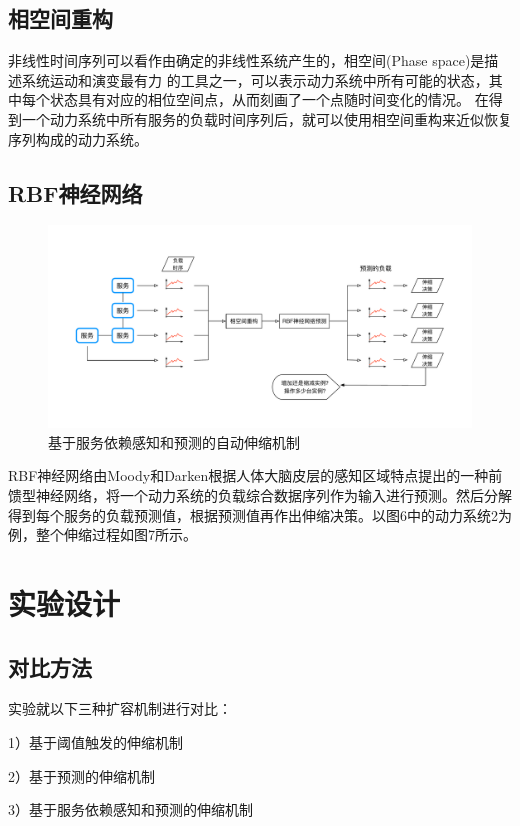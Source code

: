 \documentclass[10.5pt,twocolumn]{jbuaa}
\begin{document}
\subsection{相空间重构}
非线性时间序列可以看作由确定的非线性系统产生的，相空间(Phase space)是描述系统运动和演变最有力 的工具之一，可以表示动力系统中所有可能的状态，其中每个状态具有对应的相位空间点，从而刻画了一个点随时间变化的情况。
在得到一个动力系统中所有服务的负载时间序列后，就可以使用相空间重构来近似恢复序列构成的动力系统。

\subsection{RBF神经网络}

\begin{figure}[!t]
\centering
\includegraphics [scale=0.5,trim=0 0 0 0]{./image/7.pdf}
\caption{基于服务依赖感知和预测的自动伸缩机制}
\end{figure}
RBF神经网络由Moody和Darken根据人体大脑皮层的感知区域特点提出的一种前馈型神经网络，将一个动力系统的负载综合数据序列作为输入进行预测。然后分解得到每个服务的负载预测值，根据预测值再作出伸缩决策。以图6中的动力系统2为例，整个伸缩过程如图7所示。



\section{实验设计}

\subsection{对比方法}
实验就以下三种扩容机制进行对比：

1）基于阈值触发的伸缩机制

2）基于预测的伸缩机制

3）基于服务依赖感知和预测的伸缩机制
\end{document}
